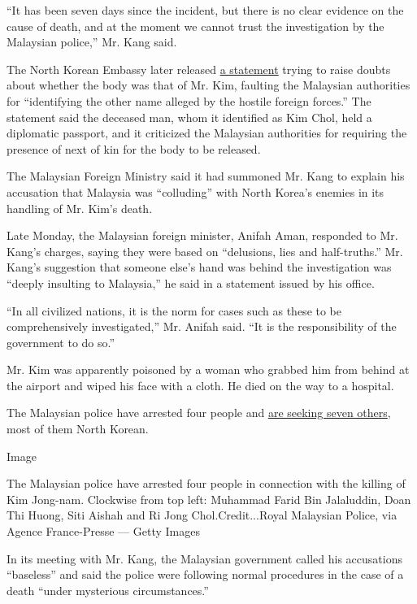 ``It has been seven days since the incident, but there is no clear
evidence on the cause of death, and at the moment we cannot trust the
investigation by the Malaysian police,'' Mr. Kang said.

The North Korean Embassy later released
\href{https://twitter.com/trinnaleong/status/833593463320907781}{a
statement} trying to raise doubts about whether the body was that of Mr.
Kim, faulting the Malaysian authorities for ``identifying the other name
alleged by the hostile foreign forces.'' The statement said the deceased
man, whom it identified as Kim Chol, held a diplomatic passport, and it
criticized the Malaysian authorities for requiring the presence of next
of kin for the body to be released.

The Malaysian Foreign Ministry said it had summoned Mr. Kang to explain
his accusation that Malaysia was ``colluding'' with North Korea's
enemies in its handling of Mr. Kim's death.

Late Monday, the Malaysian foreign minister, Anifah Aman, responded to
Mr. Kang's charges, saying they were based on ``delusions, lies and
half-truths.'' Mr. Kang's suggestion that someone else's hand was behind
the investigation was ``deeply insulting to Malaysia,'' he said in a
statement issued by his office.

``In all civilized nations, it is the norm for cases such as these to be
comprehensively investigated,'' Mr. Anifah said. ``It is the
responsibility of the government to do so.''

Mr. Kim was apparently poisoned by a woman who grabbed him from behind
at the airport and wiped his face with a cloth. He died on the way to a
hospital.

The Malaysian police have arrested four people and
\href{https://www.nytimes.com/2017/02/19/world/asia/malaysia-killing-of-kim-jong-nam.html}{are
seeking seven others}, most of them North Korean.

Image

The Malaysian police have arrested four people in connection with the
killing of Kim Jong-nam. Clockwise from top left: Muhammad Farid Bin
Jalaluddin, Doan Thi Huong, Siti Aishah and Ri Jong Chol.Credit...Royal
Malaysian Police, via Agence France-Presse --- Getty Images

In its meeting with Mr. Kang, the Malaysian government called his
accusations ``baseless'' and said the police were following normal
procedures in the case of a death ``under mysterious circumstances.''


